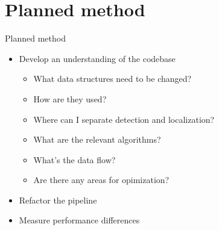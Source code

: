 \documentclass{beamer}
\begin{document}
\section{Planned method}
\begin{frame}{Planned method}
    \begin{itemize}
        \pause{} \item Develop an understanding of the codebase
            \begin{itemize}
                \pause{} \item What data structures need to be changed?
                \item How are they used?
                \pause{} \item Where can I separate detection and localization?
                \item What are the relevant algorithms?
                \item What's the data flow?
                \pause{} \item Are there any areas for opimization?
            \end{itemize}
        \pause{} \item Refactor the pipeline
        \pause{} \item Measure performance differences
    \end{itemize}
\end{frame}
\end{document}
